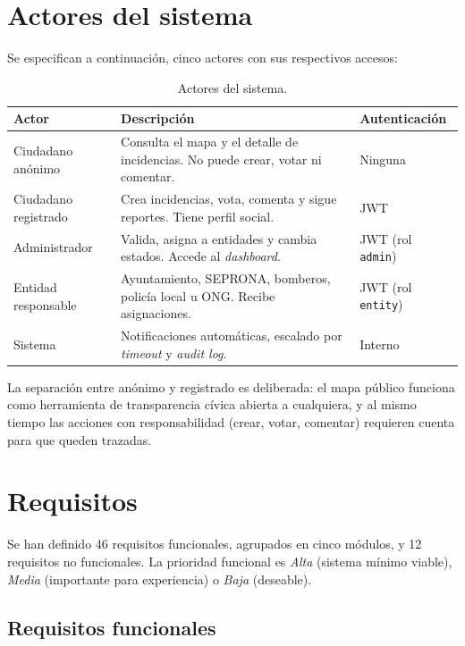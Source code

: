 \clearpage
\section{Actores del sistema}
\label{sec:actores}

Se especifican a continuación, cinco actores con sus respectivos accesos:

\begin{table}[H]
\centering
\caption{Actores del sistema.}
\label{tab:actores}
\small
\begin{tabular}{@{}L{3.2cm}L{7.5cm}L{3cm}@{}}
\toprule
\textbf{Actor} & \textbf{Descripción} & \textbf{Autenticación} \\
\midrule
Ciudadano anónimo       & Consulta el mapa y el detalle de incidencias. No puede crear, votar ni comentar. & Ninguna \\
Ciudadano registrado    & Crea incidencias, vota, comenta y sigue reportes. Tiene perfil social. & JWT \\
Administrador           & Valida, asigna a entidades y cambia estados. Accede al \textit{dashboard}. & JWT (rol \texttt{admin}) \\
Entidad responsable     & Ayuntamiento, SEPRONA, bomberos, policía local u ONG. Recibe asignaciones. & JWT (rol \texttt{entity}) \\
Sistema                 & Notificaciones automáticas, escalado por \textit{timeout} y \textit{audit log}. & Interno \\
\bottomrule
\end{tabular}
\end{table}

La separación entre anónimo y registrado es deliberada: el mapa público funciona como herramienta de transparencia cívica abierta a cualquiera, y al mismo tiempo las acciones con responsabilidad (crear, votar, comentar) requieren cuenta para que queden trazadas.


\section{Requisitos}
\label{sec:requisitos}

Se han definido 46 requisitos funcionales, agrupados en cinco módulos, y 12 requisitos no funcionales. La prioridad funcional es \textit{Alta} (sistema mínimo viable), \textit{Media} (importante para experiencia) o \textit{Baja} (deseable).


\subsection{Requisitos funcionales}
\label{subsec:rf}

